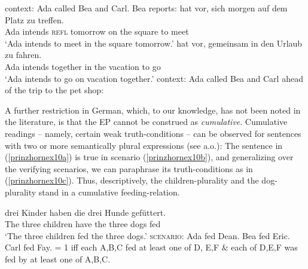 \documentclass[output=paper,colorlinks,citecolor=brown,
]{langscibook}
\begin{document}
\ea \label{prinzhornex8} {\sc context: } Ada called Bea and Carl. Bea reports:
\ea {} {hat} {vor}, {sich} {morgen} {auf} {dem} {Platz} {zu} {treffen}.\\
   Ada intends {} \textsc{refl} tomorrow on the square to meet\\
\glt `Ada intends to meet in the square tomorrow.'\label{prinzhorncoll-pred}
\ex   {} {hat} {vor}, {gemeinsam} {in} {den} {Urlaub} {zu} {fahren}.\\
   Ada intends {} together in the vacation to go\\
\glt `Ada intends to go on vacation together.'\label{prinzhornvaca}
\z 
\ex \label{prinzhornex9} {\sc context: } Ada called Bea and Carl ahead of the trip to the pet shop:
\z \z

A further restriction in German, which, to our knowledge, has not been noted in the literature, is that the EP cannot be construed as {\it cumulative}. Cumulative readings -- namely, certain weak truth-conditions -- can be observed for sentences with two or more semantically plural expressions (see \citealt{Langendoen:1978} a.o.): The sentence in (\ref{prinzhornex10a}) is true in  scenario (\ref{prinzhornex10b}), and generalizing over the verifying scenarios, we can paraphrase its truth-conditions as in (\ref{prinzhornex10c}). Thus, descriptively, the children-plurality and the dog-plurality stand in a cumulative feeding-relation.

\ea \label{prinzhornmyex}
\ea {} {drei}  {Kinder} {haben} {die} {drei} {Hunde} {gefüttert}.\\
    The three children have the three dogs fed \\
\glt `The three children fed the three dogs.' \label{prinzhornex10a}
\ex   \textsc{scenario}: Ada fed Dean. Bea fed Eric. Carl fed Fay.  \label{prinzhornex10b}
\ex \sem{}{(\ref{prinzhornex10a})} = 1 iff each A,B,C fed at least one of  D, E,F $\&$ each of D,E,F was fed by at least one of A,B,C.\label{prinzhornex10c}
\z \z
\end{document}

